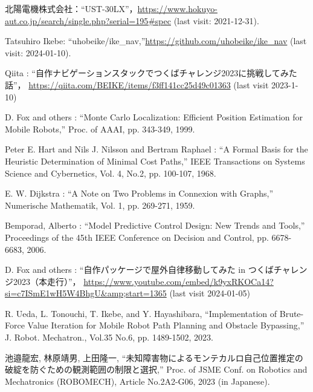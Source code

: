 \documentclass[twocolumn,9pt]{jsproceedings}
\begin{document}
\begin{thebibliography}{99}

  北陽電機株式会社：``UST-30LX''，\url{https://www.hokuyo-aut.co.jp/search/single.php?serial=195#spec} (last visit: 2021-12-31).




  Tatsuhiro Ikebe: ``uhobeike/ike\_nav,''\url{https://github.com/uhobeike/ike_nav} (last visit: 2024-01-10).

  Qiita : ``自作ナビゲーションスタックでつくばチャレンジ2023に挑戦してみた話''，
  \url{https://qiita.com/BEIKE/items/f3ff141cc25d49c01363} (last visit 2023-1-10)

  D. Fox and others : ``Monte Carlo Localization: Efficient Position Estimation for Mobile Robots,''
  Proc. of AAAI, pp. 343-349, 1999.

  Peter E. Hart and Nils J. Nilsson and Bertram Raphael : ``A Formal Basis for the Heuristic Determination of Minimal Cost Paths,''
  IEEE Transactions on Systems Science and Cybernetics, Vol. 4, No.2, pp. 100-107, 1968.

  E. W. Dijkstra : ``A Note on Two Problems in Connexion with Graphs,''
  Numerische Mathematik, Vol. 1, pp. 269-271, 1959.

  Bemporad, Alberto : ``Model Predictive Control Design: New Trends and Tools,''
  Proceedings of the 45th IEEE Conference on Decision and Control, pp. 6678-6683, 2006.

  D. Fox and others : ``自作パッケージで屋外自律移動してみた in つくばチャレンジ2023（本走行）''，
  \url{https://www.youtube.com/embed/k9yxRKOCa14?si=c7ISmE1wH5W4BhgU&amp;start=1365} (last visit 2024-01-05)

  R. Ueda, L. Tonouchi, T. Ikebe, and Y. Hayashibara, “Implementation of Brute-Force Value Iteration for Mobile Robot Path Planning and Obstacle Bypassing,” 
  J. Robot. Mechatron., Vol.35 No.6, pp. 1489-1502, 2023.

  池邉龍宏, 林原靖男, 上田隆一, “未知障害物によるモンテカルロ自己位置推定の破綻を防ぐための観測範囲の制限と選択,” 
  Proc. of JSME Conf. on Robotics and Mechatronics (ROBOMECH), Article No.2A2-G06, 2023 (in Japanese).
\end{thebibliography}
\end{document}
